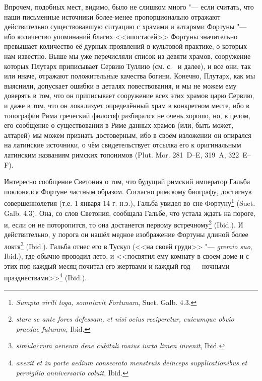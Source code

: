 
Впрочем, подобных мест, видимо, было не слишком много "--- если считать, что наши письменные источники более-менее пропорционально отражают действительно существовавшую ситуацию с храмами и алтарями Фортуны "--- ибо количество упоминаний благих <<ипостасей>> Фортуны значительно превышает количество её дурных проявлений в культовой практике, о которых нам известно. Выше мы уже перечисляли список из девяти храмов, сооружение которых Плутарх приписывает Сервию Туллию (см. с.~\pageref{PlutarchosDeServio} и далее), и все они, так или иначе, отражают положительные качества богини. Конечно, Плутарх, как мы выяснили, допускает ошибки в деталях повествования, и мы не можем ему доверять в том, что он приписывает сооружение всех этих храмов царю Сервию, и даже в том, что он локализует определённый храм в конкретном месте, ибо в топографии Рима греческий философ разбирался не очень хорошо, но, в целом, его сообщение о существовании в Риме данных храмов (или, быть может, алтарей) мы можем признать достоверным, ибо в своём изложении он опирался на латинские источники, о чём свидетельствует отсылка его к оригинальным латинским названиям римских топонимов (Plut. Mor. 281~D--E, 319~A, 322~E--F).


Интересно сообщение Светония о том, что будущий римский император Гальба поклонялся Фортуне частным образом. Согласно римскому биографу, достигнув совершеннолетия (т.е. 1 января 14 г. н.э.), Гальба увидел во сне Фортуну\footnote{\textit{Sumpta virili toga, somniavit Fortunam}, Suet. Galb. 4.3.} (Suet. Galb. 4.3). Она, со слов Светония, сообщала Гальбе, что устала ждать на пороге, и, если он не поторопится, то она достанется первому встречному\footnote{\textit{stare se ante fores defessam, et nisi ocius reciperetur, cuicumque obvio praedae futuram}, Ibid.} (Ibid.). И действительно, у порога он нашёл медное изображение Фортуны длиной более локтя\footnote{\textit{simulacrum aeneum deae cubitali maius iuxta limen invenit}, Ibid.} (Ibid.). Гальба отнес его в Тускул (<<на своей груди>> "--- \textit{gremio suo}, Ibid.), где обычно проводил лето, и <<посвятил ему комнату в своем доме и с этих пор каждый месяц почитал его жертвами и каждый год — ночными празднествами>>\footnote{\textit{avexit et in parte aedium consecrato menstruis deinceps supplicationibus et pervigilio anniversario coluit}, Ibid.} (Ibid.).

